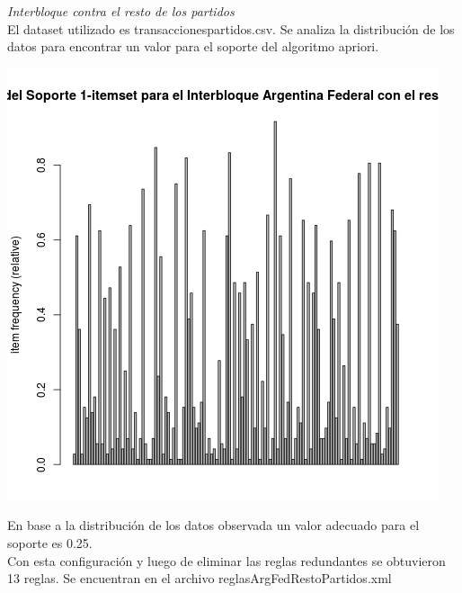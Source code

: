 \documentclass{endm}
\begin{document}
\textit{Interbloque contra el resto de los partidos} \\

El dataset utilizado es transaccionespartidos.csv. Se analiza la distribución de los datos para encontrar un valor para el soporte del algoritmo apriori. \\

\begin{center}
\includegraphics[scale=0.4]{graficos/soportesArgFedPartidosRestoPartidos.png}
\end{center}

En base a la distribución de los datos observada un valor adecuado para el soporte es 0.25. \\

Con esta configuración y luego de eliminar las reglas redundantes se obtuvieron 13 reglas. Se encuentran en el archivo reglasArgFedRestoPartidos.xml  \\
\end{document}
